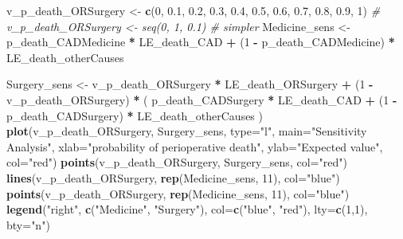 \documentclass[
]{article}
\newenvironment{Shaded}{\begin{snugshade}}{\end{snugshade}}
\newcommand{\AttributeTok}[1]{\textcolor[rgb]{0.13,0.29,0.53}{#1}}
\newcommand{\CommentTok}[1]{\textcolor[rgb]{0.56,0.35,0.01}{\textit{#1}}}
\newcommand{\DecValTok}[1]{\textcolor[rgb]{0.00,0.00,0.81}{#1}}
\newcommand{\FloatTok}[1]{\textcolor[rgb]{0.00,0.00,0.81}{#1}}
\newcommand{\FunctionTok}[1]{\textcolor[rgb]{0.13,0.29,0.53}{\textbf{#1}}}
\newcommand{\NormalTok}[1]{#1}
\newcommand{\OtherTok}[1]{\textcolor[rgb]{0.56,0.35,0.01}{#1}}
\newcommand{\SpecialCharTok}[1]{\textcolor[rgb]{0.81,0.36,0.00}{\textbf{#1}}}
\newcommand{\StringTok}[1]{\textcolor[rgb]{0.31,0.60,0.02}{#1}}
\begin{document}
\begin{Shaded}
\begin{Highlighting}[]
\NormalTok{v\_p\_death\_ORSurgery }\OtherTok{\textless{}{-}} \FunctionTok{c}\NormalTok{(}\DecValTok{0}\NormalTok{, }\FloatTok{0.1}\NormalTok{, }\FloatTok{0.2}\NormalTok{, }\FloatTok{0.3}\NormalTok{, }\FloatTok{0.4}\NormalTok{, }\FloatTok{0.5}\NormalTok{, }\FloatTok{0.6}\NormalTok{, }\FloatTok{0.7}\NormalTok{, }\FloatTok{0.8}\NormalTok{, }\FloatTok{0.9}\NormalTok{, }\DecValTok{1}\NormalTok{)}
\CommentTok{\# v\_p\_death\_ORSurgery \textless{}{-} seq(0, 1, 0.1) \# simpler}
\NormalTok{Medicine\_sens }\OtherTok{\textless{}{-}}\NormalTok{     p\_death\_CADMedicine  }\SpecialCharTok{*}\NormalTok{ LE\_death\_CAD }\SpecialCharTok{+} 
\NormalTok{                (}\DecValTok{1} \SpecialCharTok{{-}}\NormalTok{ p\_death\_CADMedicine) }\SpecialCharTok{*}\NormalTok{ LE\_death\_otherCauses}

\NormalTok{Surgery\_sens  }\OtherTok{\textless{}{-}}\NormalTok{     v\_p\_death\_ORSurgery  }\SpecialCharTok{*}\NormalTok{ LE\_death\_ORSurgery }\SpecialCharTok{+} 
\NormalTok{                (}\DecValTok{1} \SpecialCharTok{{-}}\NormalTok{ v\_p\_death\_ORSurgery) }\SpecialCharTok{*}\NormalTok{ (      p\_death\_CADSurgery  }\SpecialCharTok{*}\NormalTok{ LE\_death\_CAD }\SpecialCharTok{+} 
\NormalTok{                                              (}\DecValTok{1} \SpecialCharTok{{-}}\NormalTok{ p\_death\_CADSurgery) }\SpecialCharTok{*}\NormalTok{ LE\_death\_otherCauses}
\NormalTok{                                            )}
\FunctionTok{plot}\NormalTok{(v\_p\_death\_ORSurgery, Surgery\_sens, }\AttributeTok{type=}\StringTok{"l"}\NormalTok{, }\AttributeTok{main=}\StringTok{"Sensitivity Analysis"}\NormalTok{, }
     \AttributeTok{xlab=}\StringTok{"probability of perioperative death"}\NormalTok{, }\AttributeTok{ylab=}\StringTok{"Expected value"}\NormalTok{, }\AttributeTok{col=}\StringTok{"red"}\NormalTok{)}
\FunctionTok{points}\NormalTok{(v\_p\_death\_ORSurgery, Surgery\_sens, }\AttributeTok{col=}\StringTok{"red"}\NormalTok{)}
\FunctionTok{lines}\NormalTok{(v\_p\_death\_ORSurgery, }\FunctionTok{rep}\NormalTok{(Medicine\_sens, }\DecValTok{11}\NormalTok{), }\AttributeTok{col=}\StringTok{"blue"}\NormalTok{)}
\FunctionTok{points}\NormalTok{(v\_p\_death\_ORSurgery, }\FunctionTok{rep}\NormalTok{(Medicine\_sens, }\DecValTok{11}\NormalTok{), }\AttributeTok{col=}\StringTok{"blue"}\NormalTok{)}
\FunctionTok{legend}\NormalTok{(}\StringTok{"right"}\NormalTok{, }\FunctionTok{c}\NormalTok{(}\StringTok{"Medicine"}\NormalTok{, }\StringTok{"Surgery"}\NormalTok{), }\AttributeTok{col=}\FunctionTok{c}\NormalTok{(}\StringTok{"blue"}\NormalTok{, }\StringTok{"red"}\NormalTok{), }\AttributeTok{lty=}\FunctionTok{c}\NormalTok{(}\DecValTok{1}\NormalTok{,}\DecValTok{1}\NormalTok{), }\AttributeTok{bty=}\StringTok{"n"}\NormalTok{)}
\end{Highlighting}
\end{Shaded}
\end{document}
